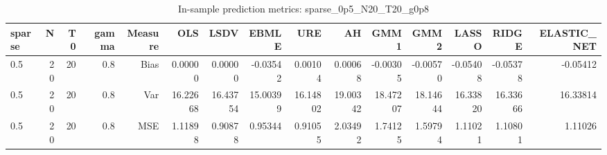 \begin{table}[!htbp]\centering
\caption{In-sample prediction metrics: sparse_0p5_N20_T20_g0p8}
\label{tab:table2_sparse_0p5_N20_T20_g0p8}
\begin{tabular}{lrrrrrrrrrrrrrr}
\hline
sparse & N & T0 & gamma & Measure & OLS & LSDV & EBMLE & URE & AH & GMM1 & GMM2 & LASSO & RIDGE & ELASTIC_NET \\
\hline
0.5 & 20 & 20 & 0.8 & Bias & 0.00000 & 0.00000 & -0.03542 & 0.00104 & 0.00068 & -0.00305 & -0.00570 & -0.05408 & -0.05378 & -0.05412 \\
0.5 & 20 & 20 & 0.8 & Var & 16.22668 & 16.43754 & 15.00399 & 16.14802 & 19.00342 & 18.47207 & 18.14644 & 16.33820 & 16.33666 & 16.33814 \\
0.5 & 20 & 20 & 0.8 & MSE & 1.11898 & 0.90878 & 0.95344 & 0.91055 & 2.03492 & 1.74125 & 1.59794 & 1.11021 & 1.10801 & 1.11026 \\
\hline
\end{tabular}
\end{table}

